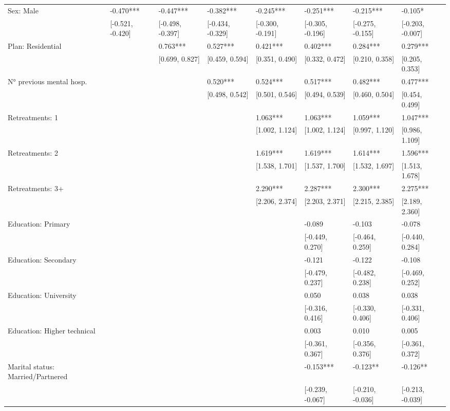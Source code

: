 \documentclass[
  spanish,
  10pt,
]{article}
\begin{document}
\begin{table}[H]
{\begin{tabular}[t]{llllllll}
Sex: Male & -0.470*** & -0.447*** & -0.382*** & -0.245*** & -0.251*** & -0.215*** & -0.105*\\
 & {}[-0.521, -0.420] & {}[-0.498, -0.397] & {}[-0.434, -0.329] & {}[-0.300, -0.191] & {}[-0.305, -0.196] & {}[-0.275, -0.155] & {}[-0.203, -0.007]\\
Plan: Residential &  & 0.763*** & 0.527*** & 0.421*** & 0.402*** & 0.284*** & 0.279***\\
 &  & {}[0.699, 0.827] & {}[0.459, 0.594] & {}[0.351, 0.490] & {}[0.332, 0.472] & {}[0.210, 0.358] & {}[0.205, 0.353]\\
N° previous mental hosp. &  &  & 0.520*** & 0.524*** & 0.517*** & 0.482*** & 0.477***\\
 &  &  & {}[0.498, 0.542] & {}[0.501, 0.546] & {}[0.494, 0.539] & {}[0.460, 0.504] & {}[0.454, 0.499]\\
Retreatments: 1 &  &  &  & 1.063*** & 1.063*** & 1.059*** & 1.047***\\
 &  &  &  & {}[1.002, 1.124] & {}[1.002, 1.124] & {}[0.997, 1.120] & {}[0.986, 1.109]\\
Retreatments: 2 &  &  &  & 1.619*** & 1.619*** & 1.614*** & 1.596***\\
 &  &  &  & {}[1.538, 1.701] & {}[1.537, 1.700] & {}[1.532, 1.697] & {}[1.513, 1.678]\\
Retreatments: 3+ &  &  &  & 2.290*** & 2.287*** & 2.300*** & 2.275***\\
 &  &  &  & {}[2.206, 2.374] & {}[2.203, 2.371] & {}[2.215, 2.385] & {}[2.189, 2.360]\\
Education: Primary &  &  &  &  & -0.089 & -0.103 & -0.078\\
 &  &  &  &  & {}[-0.449, 0.270] & {}[-0.464, 0.259] & {}[-0.440, 0.284]\\
Education: Secondary &  &  &  &  & -0.121 & -0.122 & -0.108\\
 &  &  &  &  & {}[-0.479, 0.237] & {}[-0.482, 0.238] & {}[-0.469, 0.252]\\
Education: University &  &  &  &  & 0.050 & 0.038 & 0.038\\
 &  &  &  &  & {}[-0.316, 0.416] & {}[-0.330, 0.406] & {}[-0.331, 0.406]\\
Education: Higher technical &  &  &  &  & 0.003 & 0.010 & 0.005\\
 &  &  &  &  & {}[-0.361, 0.367] & {}[-0.356, 0.376] & {}[-0.361, 0.372]\\
Marital status: Married/Partnered &  &  &  &  & -0.153*** & -0.123** & -0.126**\\
 &  &  &  &  & {}[-0.239, -0.067] & {}[-0.210, -0.036] & {}[-0.213, -0.039]\\

\end{tabular}}
\end{table}
\end{document}

